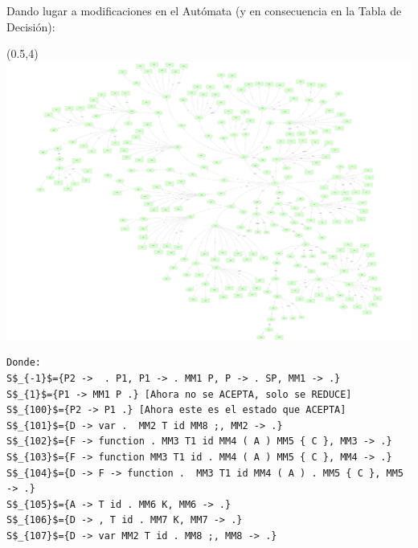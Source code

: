 \documentclass[a4paper, 12pt]{article}
\begin{document}
\newpage
Dando lugar a modificaciones en el Autómata (y en consecuencia en la Tabla de Decisión):
\begin{textblock}{1}(0.5,4)
\centering
\includegraphics[width=20cm]{Enrico.pdf}
\end{textblock}
\newpage
\begin{lstlisting}[style =EstadosAutomataST]
Donde:
S$_{-1}$={P2 ->  . P1, P1 -> . MM1 P, P -> . SP, MM1 -> .}
S$_{1}$={P1 -> MM1 P .} [Ahora no se ACEPTA, solo se REDUCE]
S$_{100}$={P2 -> P1 .} [Ahora este es el estado que ACEPTA]
S$_{101}$={D -> var .  MM2 T id MM8 ;, MM2 -> .}
S$_{102}$={F -> function . MM3 T1 id MM4 ( A ) MM5 { C }, MM3 -> .}
S$_{103}$={F -> function MM3 T1 id . MM4 ( A ) MM5 { C }, MM4 -> .}
S$_{104}$={D -> F -> function .  MM3 T1 id MM4 ( A ) . MM5 { C }, MM5 -> .}
S$_{105}$={A -> T id . MM6 K, MM6 -> .}
S$_{106}$={D -> , T id . MM7 K, MM7 -> .}
S$_{107}$={D -> var MM2 T id . MM8 ;, MM8 -> .}
\end{lstlisting}
\end{document}
